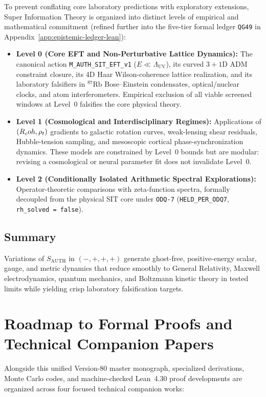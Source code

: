 To prevent conflating core laboratory predictions with exploratory extensions, Super Information Theory is organized into distinct levels of empirical and mathematical commitment (refined further into the five-tier formal ledger \texttt{QG49} in Appendix~\ref{app:epistemic-ledger-lean}):
\begin{itemize}
  \item \textbf{Level 0 (Core EFT and Non-Perturbative Lattice Dynamics):} The canonical action \texttt{M\_AUTH\_SIT\_EFT\_v1} ($E \ll \Lambda_{\mathrm{UV}}$), its curved $3+1$D ADM constraint closure, its 4D Haar Wilson-coherence lattice realization, and its laboratory falsifiers in $^{87}\mathrm{Rb}$ Bose--Einstein condensates, optical/nuclear clocks, and atom interferometers. Empirical exclusion of all viable screened windows at Level~0 falsifies the core physical theory.
  \item \textbf{Level 1 (Cosmological and Interdisciplinary Regimes):} Applications of $(R_coh, \rho_t)$ gradients to galactic rotation curves, weak-lensing shear residuals, Hubble-tension sampling, and mesoscopic cortical phase-synchronization dynamics. These models are constrained by Level~0 bounds but are modular: revising a cosmological or neural parameter fit does not invalidate Level~0.
  \item \textbf{Level 2 (Conditionally Isolated Arithmetic Spectral Explorations):} Operator-theoretic comparisons with zeta-function spectra, formally decoupled from the physical SIT core under \texttt{ODQ-7} (\texttt{HELD\_PER\_ODQ7}, \texttt{rh\_solved = false}).
\end{itemize}

\subsection{Summary}

Variations of $S_{\mathrm{AUTH}}$ in $(-,+,+,+)$ generate ghost-free, positive-energy scalar, gauge, and metric dynamics that reduce smoothly to General Relativity, Maxwell electrodynamics, quantum mechanics, and Boltzmann kinetic theory in tested limits while yielding crisp laboratory falsification targets.

\section{Roadmap to Formal Proofs and Technical Companion Papers}
\label{app:roadmap}

Alongside this unified Version-80 master monograph, specialized derivations, Monte Carlo codes, and machine-checked Lean~4.30 proof developments are organized across four focused technical companion works:

